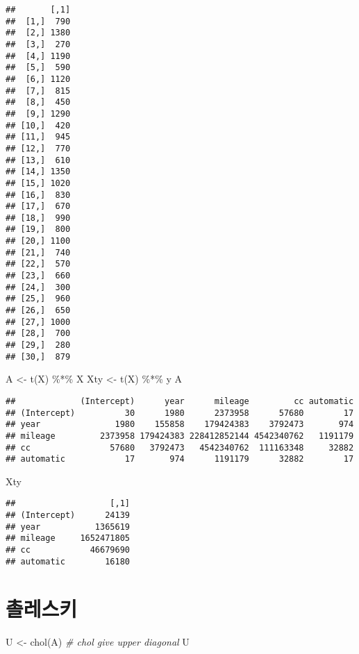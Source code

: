 \documentclass[
]{book}
\newenvironment{Shaded}{\begin{snugshade}}{\end{snugshade}}
\newcommand{\CommentTok}[1]{\textcolor[rgb]{0.56,0.35,0.01}{\textit{#1}}}
\newcommand{\FunctionTok}[1]{\textcolor[rgb]{0.00,0.00,0.00}{#1}}
\newcommand{\NormalTok}[1]{#1}
\newcommand{\OtherTok}[1]{\textcolor[rgb]{0.56,0.35,0.01}{#1}}
\newcommand{\SpecialCharTok}[1]{\textcolor[rgb]{0.00,0.00,0.00}{#1}}
\begin{document}
\begin{verbatim}
##       [,1]
##  [1,]  790
##  [2,] 1380
##  [3,]  270
##  [4,] 1190
##  [5,]  590
##  [6,] 1120
##  [7,]  815
##  [8,]  450
##  [9,] 1290
## [10,]  420
## [11,]  945
## [12,]  770
## [13,]  610
## [14,] 1350
## [15,] 1020
## [16,]  830
## [17,]  670
## [18,]  990
## [19,]  800
## [20,] 1100
## [21,]  740
## [22,]  570
## [23,]  660
## [24,]  300
## [25,]  960
## [26,]  650
## [27,] 1000
## [28,]  700
## [29,]  280
## [30,]  879
\end{verbatim}

\begin{Shaded}
\begin{Highlighting}[]
\NormalTok{A }\OtherTok{\textless{}{-}} \FunctionTok{t}\NormalTok{(X) }\SpecialCharTok{\%*\%}\NormalTok{ X}
\NormalTok{Xty }\OtherTok{\textless{}{-}} \FunctionTok{t}\NormalTok{(X) }\SpecialCharTok{\%*\%}\NormalTok{ y }
\NormalTok{A}
\end{Highlighting}
\end{Shaded}

\begin{verbatim}
##             (Intercept)      year      mileage         cc automatic
## (Intercept)          30      1980      2373958      57680        17
## year               1980    155858    179424383    3792473       974
## mileage         2373958 179424383 228412852144 4542340762   1191179
## cc                57680   3792473   4542340762  111163348     32882
## automatic            17       974      1191179      32882        17
\end{verbatim}

\begin{Shaded}
\begin{Highlighting}[]
\NormalTok{Xty}
\end{Highlighting}
\end{Shaded}

\begin{verbatim}
##                   [,1]
## (Intercept)      24139
## year           1365619
## mileage     1652471805
## cc            46679690
## automatic        16180
\end{verbatim}

\hypertarget{uxcd10uxb808uxc2a4uxd0a4}{%
\section{촐레스키}\label{uxcd10uxb808uxc2a4uxd0a4}}

\begin{Shaded}
\begin{Highlighting}[]
\NormalTok{U }\OtherTok{\textless{}{-}} \FunctionTok{chol}\NormalTok{(A) }\CommentTok{\# chol give upper diagonal}
\NormalTok{U}
\end{Highlighting}
\end{Shaded}
\end{document}
